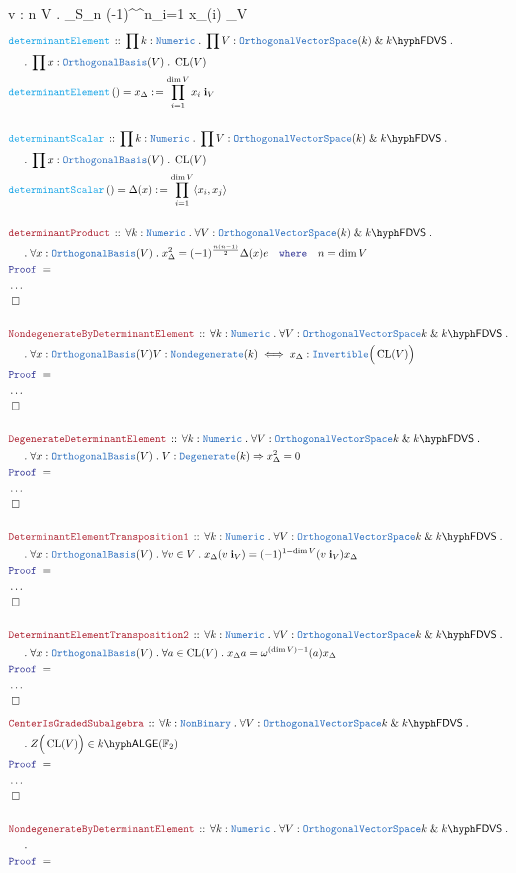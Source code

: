 \documentclass[12pt]{scrartcl}%
\newcommand{\TYPE}[1]{\textcolor{NavyBlue}{\mathtt{#1}}}%
\newcommand{\FUNC}[1]{\textcolor{Cerulean}{\mathtt{#1}}}%
\newcommand{\LOGIC}[1]{\textcolor{Blue}{\mathtt{#1}}}%
\newcommand{\THM}[1]{\textcolor{Maroon}{\mathtt{#1}}}%
\renewcommand{\.}{\; . \;} %
\newcommand{\de}{: \kern 0.1pc =} %
\newcommand{\where}{\LOGIC{where}} %
\newcommand{\Act}[1]{\left( #1 \right)} %
\newcommand{\Theorem}[2]{& \THM{#1} \, :: \, #2 \\ & \Proof = \\ } %
\newcommand{\DeclareFunc}[2]{& \FUNC{#1} \, :: \, #2 \\}%
\newcommand{\DefineNamedFunc}[4]{&  \FUNC{#1}\Act{#2} = #3 \de #4 \\}%
\newcommand{\NewLine}{\\ & \kern 1pc}%
\newcommand{\Page}[1]{ \begin{align*} #1 \end{align*}  }%
\newcommand{\NoProof}{ & \ldots \\ \EndProof}%
\renewcommand{\And}{\; \& \;}%
\newcommand{\Imply}{\Rightarrow}%
\newcommand{\QED}{\; \square} %
\newcommand{\EndProof}{& \QED \\} %
\newcommand{\Proof}{\LOGIC{Proof} \; } %
\newcommand{\OVS}{\TYPE{OrthogonalVectorSpace}}
\newcommand{\FDVS}[1]{#1\hyph\mathsf{FDVS}} %
\newcommand{\LALGE}[1]{#1\hyph\mathsf{ALGE}}%
\DeclareMathOperator{\CL}{CL}%
\begin{document}
{{		\Lambda v : n \to V \.
		 \sum_{\sigma \in S_n} (-1)^\sigma \prod^n_{i=1} x_{\sigma(i)} \; \mathbf{i}_{V}
	}
	\\
}\Page{
	\DeclareFunc{determinantElement}{
		\prod k : \TYPE{Numeric} \. 
		\prod V : \OVS(k) \And \FDVS{k} \. \NewLine \.
		\prod x : \TYPE{OrthogonalBasis}(V) \.
		\CL(V)
	}
	\DefineNamedFunc{determinantElement}
	{ }
	{x_\Delta}{\prod^{\dim V}_{i=1} x_i \; _{V}}
	\\
	\DeclareFunc{determinantScalar}{
		\prod k : \TYPE{Numeric} \. 
		\prod V : \OVS(k) \And \FDVS{k} \.
		\NewLine \. 
		\prod x : \TYPE{OrthogonalBasis}(V) \.
		\CL(V)
	}
	\DefineNamedFunc{determinantScalar}
	{ }
	{\Delta(x)}{\prod^{\dim V}_{i=1} \langle x_i,x_j \rangle}
	\\
	\Theorem{determinantProduct}
	{
		\forall k : \TYPE{Numeric} \.
		\forall V : \OVS(k) \And \FDVS{k} \.
		\NewLine \.
		\forall x : \TYPE{OrthogonalBasis}(V) \.
		x^2_\Delta = (-1)^{\frac{n(n-1)}{2}} \Delta(x) e
		\quad \where \quad n = \dim V
	}
	\NoProof
	\\
	\Theorem{NondegenerateByDeterminantElement}
	{
		\forall k : \TYPE{Numeric} \.
		\forall V : \OVS{k} \And \FDVS{k} \.\NewLine \.
		\forall x : \TYPE{OrthogonalBasis}(V)
		V : \TYPE{Nondegenerate}(k) \iff x_\Delta : \TYPE{Invertible}\Big(\CL(V)\Big)
	}
	\NoProof
	\\
	\Theorem{DegenerateDeterminantElement}
	{
		\forall k : \TYPE{Numeric} \.
		\forall V : \OVS{k} \And \FDVS{k} \.\NewLine \.
		\forall x : \TYPE{OrthogonalBasis}(V) \.
		V : \TYPE{Degenerate}(k) \Imply  x_\Delta^2 = 0
	}
	\NoProof
	\\
	\Theorem{DeterminantElementTransposition1}
	{
		\forall k : \TYPE{Numeric} \.
		\forall V : \OVS{k} \And \FDVS{k} \.\NewLine \.
		\forall x : \TYPE{OrthogonalBasis}(V) \.
		\forall v \in V \.
		x_\Delta (v \; \mathbf{i}_V) = (-1)^{1 - \dim V} (v \; \mathbf{i}_V) x_\Delta
	}
	\NoProof
	\\
	\Theorem{DeterminantElementTransposition2}
	{
		\forall k : \TYPE{Numeric} \.
		\forall V : \OVS{k} \And \FDVS{k} \.\NewLine \.
		\forall x : \TYPE{OrthogonalBasis}(V) \.
		\forall a \in  \CL(V) \.
		x_\Delta a = \omega^{ (\dim V) - 1}(a) x_\Delta
	}
	\NoProof
}\Page{
	\Theorem{CenterIsGradedSubalgebra}
	{
		\forall k : \TYPE{NonBinary} \.
		\forall V : \OVS{k} \And \FDVS{k} \. \NewLine \.
		Z\Big( \CL(V) \Big) \in \LALGE{k}(\mathbb{F}_2)
	}
	\NoProof
	\\
	\Theorem{NondegenerateByDeterminantElement}
	{
		\forall k : \TYPE{Numeric} \.
		\forall V : \OVS{k} \And \FDVS{k} \.\NewLine \.
}}
\end{document}
